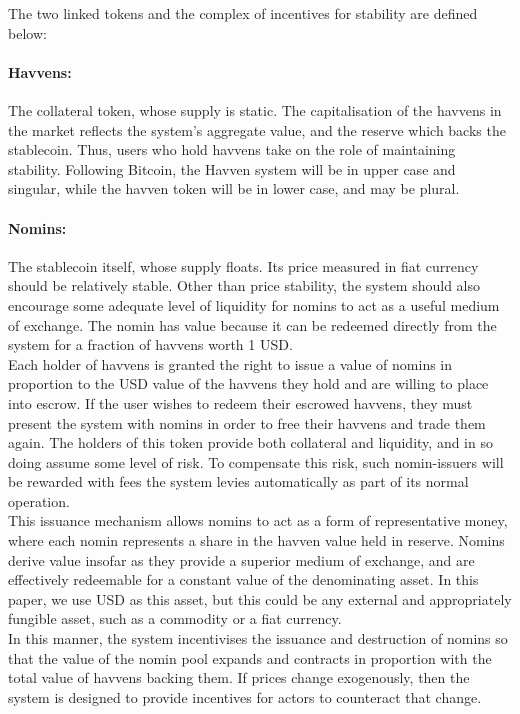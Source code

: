 \noindent The two linked tokens and the complex of incentives for stability are defined below:

\paragraph{Havvens:} The collateral token, whose supply is static.
The capitalisation of the havvens in the market reflects the system's aggregate value, and the reserve
which backs the stablecoin. Thus, users who hold havvens take on the role of maintaining stability.
Following Bitcoin, the Havven system will be in upper case and singular, while the havven token
will be in lower case, and may be plural.

\paragraph{Nomins:} The stablecoin itself, whose supply floats. Its price measured in fiat currency should be relatively stable.
Other than price stability, the system should also encourage some adequate level of liquidity for nomins
to act as a useful medium of exchange. The nomin has value because it can be redeemed directly from the system for a fraction of havvens worth 1 USD. \\


\noindent Each holder of havvens is granted the right to issue a value of nomins in proportion to the USD value
of the havvens they hold and are willing to place into escrow. If the user wishes to redeem their escrowed havvens, they must
present the system with nomins in order to free their havvens and trade them again.
The holders of this token provide both collateral and liquidity, and in so doing assume some
level of risk. To compensate this risk, such nomin-issuers will be rewarded with fees the system levies
automatically as part of its normal operation. \\

\noindent This issuance mechanism allows nomins to act as a form of representative money, where 
each nomin represents a share in the havven value held in reserve. Nomins derive value insofar as they provide
a superior medium of exchange, and are effectively redeemable for a constant value
of the denominating asset. In this paper, we use USD as this asset, but this could be any external
and appropriately fungible asset, such as a commodity or a fiat currency.  \\

\noindent In this manner, the system incentivises the issuance and destruction of nomins so that the value of
the nomin pool expands and contracts in proportion with the total value of havvens backing them.
If prices change exogenously, then the system is designed to provide incentives for actors to
counteract that change. \\

